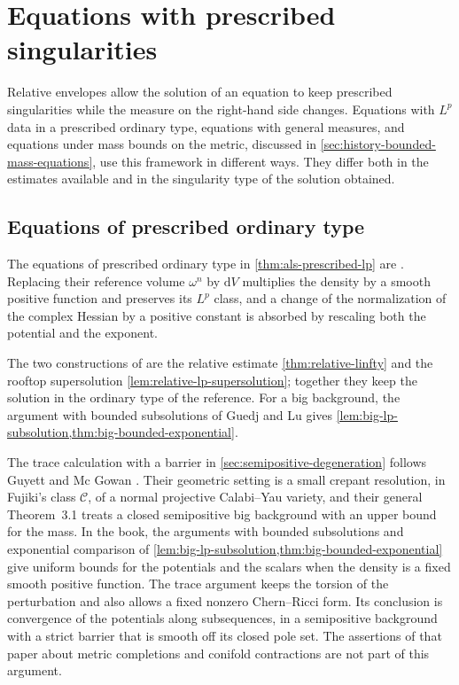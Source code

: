 \section{Equations with prescribed singularities}
\label{sec:history-prescribed}

Relative envelopes allow the solution of an equation to keep prescribed singularities while the measure on the right-hand side changes. Equations with $L^p$ data in a prescribed ordinary type, equations with general measures, and equations under mass bounds on the metric, discussed in \cref{sec:history-bounded-mass-equations}, use this framework in different ways. They differ both in the estimates available and in the singularity type of the solution obtained.

\subsection{Equations of prescribed ordinary type}

The equations of prescribed ordinary type in \cref{thm:als-prescribed-lp} are \cite[Theorems~5.4 and 5.7, pp.~34 and~37]{ALS26}. Replacing their reference volume $\omega^n$ by $\mathrm{d}V$ multiplies the density by a smooth positive function and preserves its $L^p$ class, and a change of the normalization of the complex Hessian by a positive constant is absorbed by rescaling both the potential and the exponent.

The two constructions of \cite[Lemmas~5.5--5.6, pp.~34--35]{ALS26} are the relative estimate \cref{thm:relative-linfty} and the rooftop supersolution \cref{lem:relative-lp-supersolution}; together they keep the solution in the ordinary type of the reference. For a big background, the argument with bounded subsolutions of Guedj and Lu \cite[Lemma~2.1, pp.~270--271, and Theorem~3.4, p.~279]{GL23E} gives \cref{lem:big-lp-subsolution,thm:big-bounded-exponential}.

The trace calculation with a barrier in \cref{sec:semipositive-degeneration} follows Guyett and Mc Gowan \cite[v1, Proposition~3.2, pp.~7--12]{GM26}. Their geometric setting is a small crepant resolution, in Fujiki's class $\mathcal C$, of a normal projective Calabi--Yau variety, and their general Theorem~3.1 treats a closed semipositive big background with an upper bound for the mass. In the book, the arguments with bounded subsolutions and exponential comparison of \cref{lem:big-lp-subsolution,thm:big-bounded-exponential} give uniform bounds for the potentials and the scalars when the density is a fixed smooth positive function. The trace argument keeps the torsion of the perturbation and also allows a fixed nonzero Chern--Ricci form. Its conclusion is convergence of the potentials along subsequences, in a semipositive background with a strict barrier that is smooth off its closed pole set. The assertions of that paper about metric completions and conifold contractions are not part of this argument.

